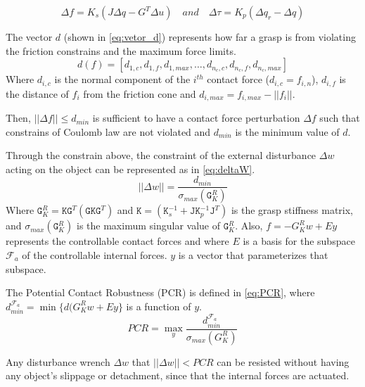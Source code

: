 \begin{equation}\label{eq:force_torque_variation}
     \Delta f = K_s(J \Delta q - G^T\Delta u) \quad and \quad
     \Delta \tau = K_p(\Delta q_r - \Delta q)
 \end{equation}
    
The vector $d$ (shown in \eqref{eq:vetor_d}) represents how far a grasp is from violating the friction constrains and the maximum force limits.
\begin{equation}\label{eq:vetor_d}
    d(f) = [d_{1,c}, d_{1,f}, d_{1,max}, \dots, d_{n_c,c}, d_{n_c,f}, d_{n_c,max}]
\end{equation}
Where $d_{i,c}$ is the normal component of the $i^{th}$ contact force ($d_{i,c} = f_{i,n} $), $d_{i,f}$ is the distance of \texttt{$f_i$} from the friction cone and $d_{i,max} = f_{i,max} - ||f_i||$.\par

Then, $||\Delta f|| \le d_{min}$ is sufficient to have a contact force perturbation $\Delta f$ such that constrains of Coulomb law are not violated and $d_{min}$ is the minimum value of $d$.

Through the constrain above, the constraint of the external disturbance $\Delta w$ acting on the object can be represented as in \eqref{eq:deltaW}.
 \begin{equation}\label{eq:deltaW}
     ||\Delta w || = \frac{d_{min}}{\sigma_{max}(\texttt{G}_K^R)}
 \end{equation}
 Where $\texttt{G}_K^R = \texttt{KG}^T(\texttt{GKG}^T)$ and $ \texttt{K} =( \texttt{K}_s^{-1} + \texttt{JK}_p^{-1}\texttt{J}^T)$ is the grasp stiffness matrix, and $\sigma_{max}(\texttt{G}_K^R)$ is the maximum singular value of $\texttt{G}_K^R$.
 Also, $f = -G_K^R w + Ey$ represents the controllable contact forces and where $E$ is a basis for the subspace $\mathcal{F}_a$ of the controllable internal forces. $y$ is a vector that parameterizes that subspace.
 \par
 The Potential Contact Robustness (PCR) is defined in \eqref{eq:PCR}, where $d_{min}^{\mathcal{F}_a}= \min\{d(G_K^R w+ Ey\}$ is a function of $y$.
 \begin{equation}\label{eq:PCR}
    PCR = \max_y\frac{d_{min}^{\mathcal{F}_a}}{\sigma_{max}(G_K^R)}
\end{equation} 
 
Any disturbance wrench $\Delta w$ that $||\Delta w||< PCR$ can be resisted without having any object's slippage or detachment, since that the internal forces are actuated. 

